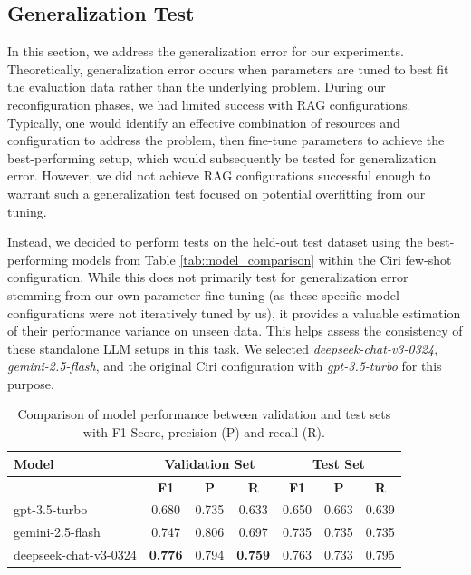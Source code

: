 \subsection{Generalization Test} \label{sec:exp_generalization}

In this section, we address the generalization error for our experiments. Theoretically, generalization error occurs when parameters are tuned to best fit the evaluation data rather than the underlying problem. During our reconfiguration phases, we had limited success with RAG configurations. Typically, one would identify an effective combination of resources and configuration to address the problem, then fine-tune parameters to achieve the best-performing setup, which would subsequently be tested for generalization error. However, we did not achieve RAG configurations successful enough to warrant such a generalization test focused on potential overfitting from our tuning.

Instead, we decided to perform tests on the held-out test dataset using the best-performing models from Table \ref{tab:model_comparison} within the Ciri few-shot configuration. While this does not primarily test for generalization error stemming from our own parameter fine-tuning (as these specific model configurations were not iteratively tuned by us), it provides a valuable estimation of their performance variance on unseen data. This helps assess the consistency of these standalone LLM setups in this task. We selected \textit{deepseek-chat-v3-0324}, \textit{gemini-2.5-flash}, and the original Ciri configuration with \textit{gpt-3.5-turbo} for this purpose. 

\begin{table}[h]
    \centering
    \begin{tabular}{|l|c|c|c|c|c|c|}
        \hline
        \textbf{Model} & \multicolumn{3}{c|}{\textbf{Validation Set}} & \multicolumn{3}{c|}{\textbf{Test Set}} \\
        \hline
        & \textbf{F1} & \textbf{P} & \textbf{R} & \textbf{F1} &  \textbf{P} & \textbf{R} \\
        \hline
        gpt-3.5-turbo          & 0.680 & 0.735 & 0.633 & 0.650 & 0.663 & 0.639 \\
        gemini-2.5-flash       & 0.747 & 0.806 & 0.697 & 0.735 & 0.735 & 0.735 \\
        deepseek-chat-v3-0324  & \textbf{0.776} & 0.794 & \textbf{0.759} & 0.763 & 0.733 & 0.795 \\
        \hline
    \end{tabular}
    \caption{Comparison of model performance between validation and test sets with F1-Score, precision (P) and recall (R).}
    \label{tab:generalization_comparison}
\end{table}



